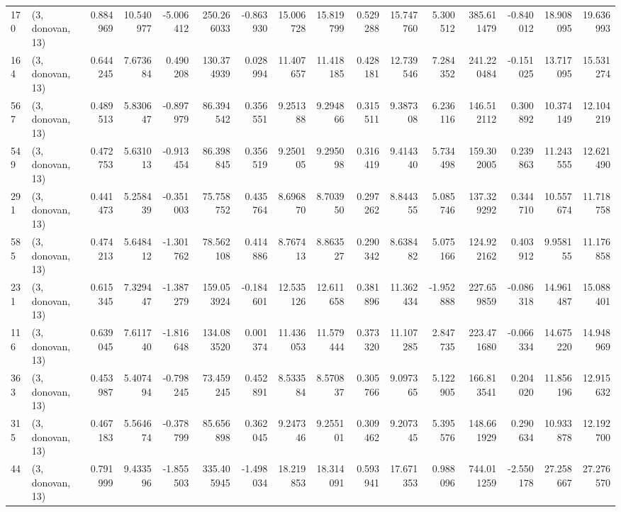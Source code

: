 \begin{tabular}{llrrrrrrrrrrrrrr}
170 &  (3, donovan, 13) &   0.884969 &  10.540977 &  -5.006412 &   250.266033 &  -0.863930 &  15.006728 &  15.819799 &  0.529288 &  15.747760 &   5.300512 &    385.611479 &  -0.840012 &  18.908095 &   19.636993 \\
164 &  (3, donovan, 13) &   0.644245 &   7.673684 &   0.490208 &   130.374939 &   0.028994 &  11.407657 &  11.418185 &  0.428181 &  12.739546 &   7.284352 &    241.220484 &  -0.151025 &  13.717095 &   15.531274 \\
567 &  (3, donovan, 13) &   0.489513 &   5.830647 &  -0.897979 &    86.394542 &   0.356551 &   9.251388 &   9.294866 &  0.315511 &   9.387308 &   6.236116 &    146.512112 &   0.300892 &  10.374149 &   12.104219 \\
549 &  (3, donovan, 13) &   0.472753 &   5.631013 &  -0.913454 &    86.398845 &   0.356519 &   9.250105 &   9.295098 &  0.316419 &   9.414340 &   5.734498 &    159.302005 &   0.239863 &  11.243555 &   12.621490 \\
291 &  (3, donovan, 13) &   0.441473 &   5.258439 &  -0.351003 &    75.758752 &   0.435764 &   8.696870 &   8.703950 &  0.297262 &   8.844355 &   5.085746 &    137.329292 &   0.344710 &  10.557674 &   11.718758 \\
585 &  (3, donovan, 13) &   0.474213 &   5.648412 &  -1.301762 &    78.562108 &   0.414886 &   8.767413 &   8.863527 &  0.290342 &   8.638482 &   5.075166 &    124.922162 &   0.403912 &   9.958155 &   11.176858 \\
231 &  (3, donovan, 13) &   0.615345 &   7.329447 &  -1.387279 &   159.053924 &  -0.184601 &  12.535126 &  12.611658 &  0.381896 &  11.362434 &  -1.952888 &    227.659859 &  -0.086318 &  14.961487 &   15.088401 \\
116 &  (3, donovan, 13) &   0.639045 &   7.611740 &  -1.816648 &   134.083520 &   0.001374 &  11.436053 &  11.579444 &  0.373320 &  11.107285 &   2.847735 &    223.471680 &  -0.066334 &  14.675220 &   14.948969 \\
363 &  (3, donovan, 13) &   0.453987 &   5.407494 &  -0.798245 &    73.459245 &   0.452891 &   8.533584 &   8.570837 &  0.305766 &   9.097365 &   5.122905 &    166.813541 &   0.204020 &  11.856196 &   12.915632 \\
315 &  (3, donovan, 13) &   0.467183 &   5.564674 &  -0.378799 &    85.656898 &   0.362045 &   9.247346 &   9.255101 &  0.309462 &   9.207345 &   5.395576 &    148.661929 &   0.290634 &  10.933878 &   12.192700 \\
44  &  (3, donovan, 13) &   0.791999 &   9.433596 &  -1.855503 &   335.405945 &  -1.498034 &  18.219853 &  18.314091 &  0.593941 &  17.671353 &   0.988096 &    744.011259 &  -2.550178 &  27.258667 &   27.276570 \\

\end{tabular}

